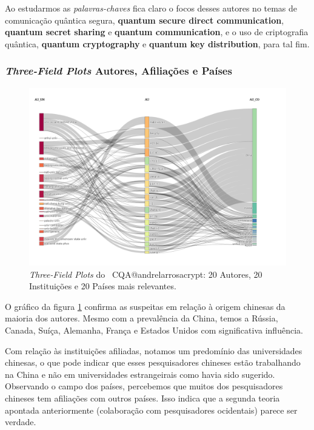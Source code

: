Ao estudarmos as \textit{palavras-chaves} fica claro o focos desses autores no temas de comunicação quântica segura, \textbf{quantum secure direct communication}, \textbf{quantum secret sharing} e \textbf{quantum communication}, e o uso de criptografia quântica, \textbf{quantum cryptography} e \textbf{quantum key distribution}, para tal fim.


\subsubsection{\textit{Three-Field Plots} Autores, Afiliações e Países}

\begin{figure}
    \centering
    \includegraphics[angle=0,width=1\textwidth]{experiments/andrelarrosacrypt/AnaliseBibliometrica/CriptografiaQuantica/imagens/CQA@andrelarrosacrypt_Aut_Aff_Coun.png}
    \caption{\textit{Three-Field Plots} do \dataset\ CQA@andrelarrosacrypt: 20 Autores, 20 Instituições e 20 Países mais relevantes.}
    \label{CQA@andrelarrosacrypt_Aut_Aff_Coun}
\end{figure}


O gráfico da figura \ref{CQA@andrelarrosacrypt_Aut_Aff_Coun} confirma as suspeitas em relação à origem chinesas da maioria dos autores. Mesmo com a prevalência da China, temos a Rússia, Canada, Suíça, Alemanha, França e Estados Unidos com significativa influência.

Com relação às instituições afiliadas, notamos um predomínio das universidades chinesas, o que pode indicar que esses pesquisadores chineses estão trabalhando na China e não em universidades estrangeirais como havia sido sugerido. Observando o campo dos países, percebemos que muitos dos pesquisadores chineses tem afiliações com outros países. Isso indica que a segunda teoria apontada anteriormente (colaboração com pesquisadores ocidentais) parece ser verdade.

